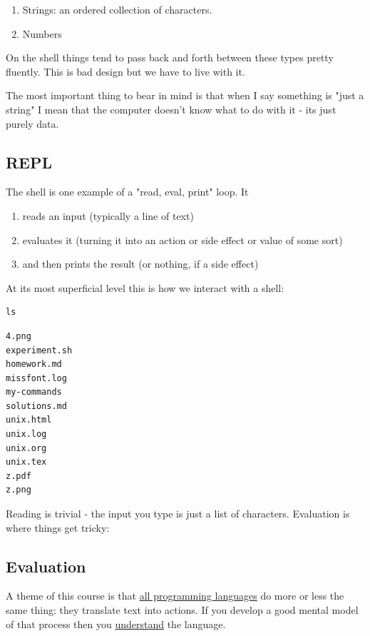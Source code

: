 \documentclass[11pt]{article}
\begin{document}
\begin{enumerate}
\item Strings: an ordered collection of characters.
\item Numbers
\end{enumerate}

On the shell things tend to pass back and forth between these types
pretty fluently. This is bad design but we have to live with it.

The most important thing to bear in mind is that when I say something
is "just a string" I mean that the computer doesn't know what to do
with it - its just purely data.

\subsection{REPL}
\label{sec:orgb2d5c2f}

The shell is one example of a "read, eval, print" loop. It 

\begin{enumerate}
\item reads an input (typically a line of text)
\item evaluates it (turning it into an action or side effect or value of
some sort)
\item and then prints the result (or nothing, if a side effect)
\end{enumerate}

At its most superficial level this is how we interact with a shell:

\begin{verbatim}
ls
\end{verbatim}

\begin{verbatim}
4.png
experiment.sh
homework.md
missfont.log
my-commands
solutions.md
unix.html
unix.log
unix.org
unix.tex
z.pdf
z.png
\end{verbatim}

Reading is trivial - the input you type is just a list of
characters. Evaluation is where things get tricky:

\subsection{Evaluation}
\label{sec:org81b7c39}

A theme of this course is that \uline{all programming languages} do more or
less the same thing: they translate text into actions. If you develop
a good mental model of that process then you \uline{understand} the
language.
\end{document}
